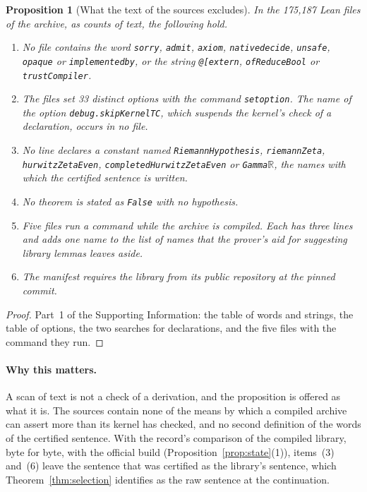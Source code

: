 \documentclass[11pt]{article}
\newtheorem{proposition}[theorem]{Proposition}
\theoremstyle{definition}
\theoremstyle{remark}
\DeclareRobustCommand{\lean}[1]{{\renewcommand{\_}{\textunderscore\allowbreak}\texttt{#1}}}
\newcommand{\False}{\lean{False}}
\begin{document}
\begin{proposition}[What the text of the sources excludes]\label{prop:scan}
In the 175{,}187 Lean files of the archive, as counts of text, the following hold.
\begin{enumerate}[leftmargin=2em,itemsep=1pt]
\item No file contains the word \lean{sorry}, \lean{admit}, \lean{axiom}, \lean{native\_decide}, \lean{unsafe}, \lean{opaque} or \lean{implemented\_by}, or the string \lean{@[extern}, \lean{ofReduceBool} or \lean{trustCompiler}.
\item The files set 33 distinct options with the command \lean{set\_option}. The name of the option \lean{debug.skipKernelTC}, which suspends the kernel's check of a declaration, occurs in no file.
\item No line declares a constant named \lean{RiemannHypothesis}, \lean{riemannZeta}, \lean{hurwitzZetaEven}, \lean{completedHurwitzZetaEven} or \lean{Gamma$\mathbb R$}, the names with which the certified sentence is written.
\item No theorem is stated as \False{} with no hypothesis.
\item Five files run a command while the archive is compiled. Each has three lines and adds one name to the list of names that the prover's aid for suggesting library lemmas leaves aside.
\item The manifest requires the library from its public repository at the pinned commit.
\end{enumerate}
\end{proposition}

\begin{proof}
Part~1 of the Supporting Information: the table of words and strings, the table of options, the two searches for declarations, and the five files with the command they run.
\end{proof}

\paragraph{Why this matters.} A scan of text is not a check of a derivation, and the proposition is offered as what it is. The sources contain none of the means by which a compiled archive can assert more than its kernel has checked, and no second definition of the words of the certified sentence. With the record's comparison of the compiled library, byte for byte, with the official build (Proposition~\ref{prop:state}(1)), items~(3) and~(6) leave the sentence that was certified as the library's sentence, which Theorem~\ref{thm:selection} identifies as the raw sentence at the continuation.
\end{document}
